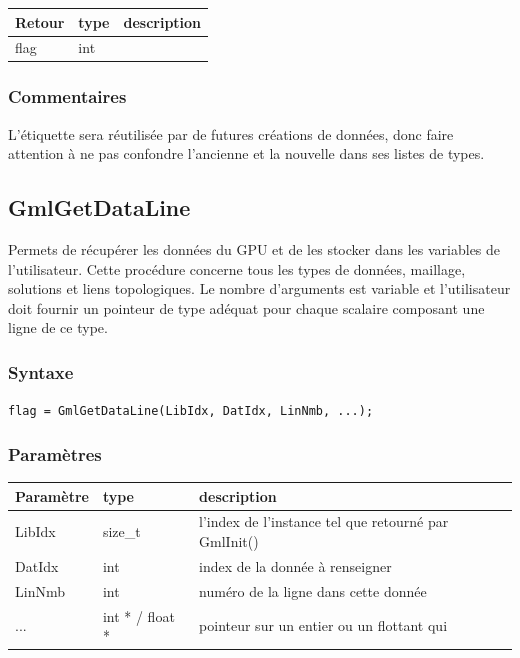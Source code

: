 \documentclass[a4paper,12pt]{article}
\begin{document}
\medskip

\begin{tabular}{|m{2cm}|m{1.5cm}|m{10.5cm}|}
\hline
Retour     & type   & description \\
\hline
flag       & int    & \\
\hline
\end{tabular}

\subsubsection*{Commentaires}
L'étiquette sera réutilisée par de futures créations de données, donc faire attention à ne pas confondre l'ancienne et la nouvelle dans ses listes de types.


\subsection{GmlGetDataLine}

Permets de récupérer les données du GPU et de les stocker dans les variables de l'utilisateur.
Cette procédure concerne tous les types de données, maillage, solutions et liens topologiques.
Le nombre d'arguments est variable et l'utilisateur doit fournir un pointeur de type adéquat pour chaque scalaire composant une ligne de ce type.

\subsubsection*{Syntaxe}

{\tt flag = GmlGetDataLine(LibIdx, DatIdx, LinNmb, ...);}

\subsubsection*{Paramètres}

\begin{tabular}{|m{2cm}|m{1.5cm}|m{10.5cm}|}
\hline
Paramètre  & type            & description \\
\hline
LibIdx     & size\_t         & l'index de l'instance tel que retourné par GmlInit() \\
\hline
DatIdx     & int             & index de la donnée à renseigner \\
\hline
LinNmb     & int             & numéro de la ligne dans cette donnée \\
\hline
...        & int * / float * & pointeur sur un entier ou un flottant qui \\
\hline
\end{tabular}
\end{document}
